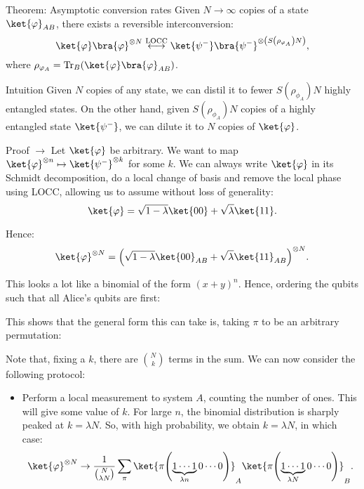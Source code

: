 \documentclass[a4paper]{article}
\begin{document}
\begin{parag}{Theorem: Asymptotic conversion rates}
    Given $N \to \infty$ copies of a state $\ket{\phi}_{AB}$, there exists a reversible interconversion: 
    \[\ket{\phi}\bra{\phi}^{\otimes N} \over{\longleftrightarrow}{LOCC} \ket{\psi^-}\bra{\psi^-}^{\otimes \left(S\left(\rho_{\phi_A}\right) N\right)},\]
    where $\rho_{\phi_A} = \Tr_B\left(\ket{\phi}\bra{\phi}_{AB}\right)$.
    
    \begin{subparag}{Intuition}
        Given $N$ copies of any state, we can distil it to fewer $S\left(\rho_{\phi_A}\right) N$ highly entangled states. On the other hand, given $S\left(\rho_{\phi_A}\right)N$ copies of a highly entangled state $\ket{\psi^-}$, we can dilute it to $N$ copies of $\ket{\phi}$.
    \end{subparag}

    \begin{subparag}{Proof $\to$}
        Let $\ket{\phi}$ be arbitrary. We want to map $\ket{\phi}^{\otimes n} \mapsto \ket{\psi^-}^{\otimes k}$ for some $k$. We can always write $\ket{\phi}$ in its Schmidt decomposition, do a local change of basis and remove the local phase using LOCC, allowing us to assume without loss of generality: 
        \[\ket{\phi} = \sqrt{1 - \lambda} \ket{00} + \sqrt{\lambda} \ket{11}.\]
        
        Hence: 
        \[\ket{\phi}^{\otimes N} = \left(\sqrt{1- \lambda}\ket{00}_{AB} + \sqrt{\lambda} \ket{11}_{AB}\right)^{\otimes N}.\]

        This looks a lot like a binomial of the form $\left(x + y\right)^{n}$. Hence, ordering the qubits such that all Alice's qubits are first: 
        
        This shows that the general form this can take is, taking $\pi$ to be an arbitrary permutation: 
        
        Note that, fixing a $k$, there are $\binom{N}{k}$ terms in the sum. We can now consider the following protocol:
        \begin{itemize}
            \item Perform a local measurement to system $A$, counting the number of ones. This will give some value of $k$. For large $n$, the binomial distribution is sharply peaked at $k = \lambda N$. So, with high probability, we obtain $k = \lambda N$, in which case: 
            \[\ket{\phi}^{\otimes N} \to \frac{1}{\binom{N}{\lambda N}} \sum_{\pi} \ket{\pi \left(\underbrace{1\cdots 1}_{\lambda n} 0 \cdots 0\right)}_A \ket{\pi \left(\underbrace{1\cdots 1}_{\lambda N} 0 \cdots 0\right)}_B.\]


\end{itemize}
\end{subparag}
\end{parag}
\end{document}
